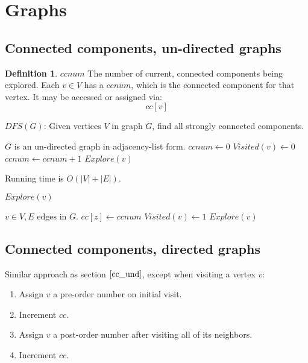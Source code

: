\documentclass{article}
\theoremstyle{definition}
\newtheorem{definition}{Definition}[section]
\begin{document}
	
\listofalgorithms
\section{Graphs}
\subsection{Connected components, un-directed graphs}
\label{cc_und}

\begin{definition}{$ccnum$}
The number of current, connected components being explored. Each $v \in V$ has a $ccnum$, which is the connected component for that vertex. It may be accessed or assigned via:
$$cc[v]$$
\end{definition}

\begin{algorithm}
\label{alg:dfs_und}
\caption{$DFS(G)$: Given vertices $V$ in graph $G$, find all strongly connected components.}
\begin{algorithmic}[1]
\REQUIRE $G$ is an un-directed graph in adjacency-list form.
\STATE $ccnum \gets 0$
\STATE $Visited(v) \gets 0$
\ENDFOR
{}
	\STATE $ccnum \gets ccnum + 1$
	\STATE $Explore(v)$
\ENDIF
\ENDFOR
\end{algorithmic}
 Running time is $O(|V|+|E|)$.
\end{algorithm}

\begin{algorithm}[H]
\caption{$Explore(v)$}
\begin{algorithmic}[1]
\REQUIRE $v \in V, E \text{ edges in } G$.
\STATE $cc[z] \gets ccnum$  
\STATE $Visited(v) \gets 1$
	\STATE $Explore(v)$
\ENDIF
\ENDFOR
\end{algorithmic}
\end{algorithm}

\subsection{Connected components, directed graphs}
Similar approach as section $\ref{cc_und}$, except when visiting a vertex $v$: 
\begin{enumerate}
\item Assign $v$ a pre-order number on initial visit.
\item Increment $cc$.
\item Assign $v$ a post-order number after visiting all of its neighbors.
\item Increment $cc$.
\end{enumerate}
\end{document}
